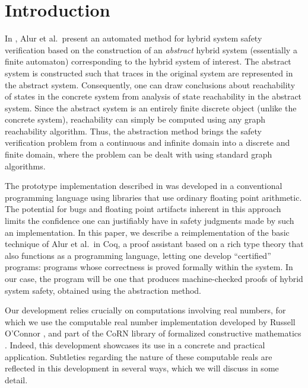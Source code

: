\documentclass[runningheads]{llncs}
\begin{document}
\nocite{*}

\section{Introduction}

In \cite{alur}, Alur et al.\ present an automated method for hybrid system
safety verification based on the construction of an \emph{abstract}
hybrid system (essentially a finite automaton) corresponding to the
hybrid system of interest. The abstract system is constructed such
that traces in the original system are represented in the abstract
system. Consequently, one can draw conclusions about reachability of
states in the concrete system from analysis of state reachability in
the abstract system. Since the abstract system is an entirely finite
discrete object (unlike the concrete system), reachability can simply
be computed using any graph reachability algorithm. Thus, the
abstraction method brings the safety verification problem from a
continuous and infinite domain into a discrete and finite domain,
where the problem can be dealt with using standard graph algorithms.

The prototype implementation described in \cite{alur} was developed in
a conventional programming language using libraries that use ordinary
floating point arithmetic. The potential for bugs and floating point
artifacts inherent in this approach limits the confidence one can
justifiably have in safety judgments made by such an
implementation. In this paper, we describe a reimplementation of the
basic technique of Alur et al.\ in Coq, a proof assistant based on a
rich type theory that also functions as a programming language,
letting one develop ``certified'' programs: programs whose correctness
is proved formally within the system. In our case, the program will be
one that produces machine-checked proofs of hybrid system safety,
obtained using the abstraction method.

Our development relies crucially on computations involving real
numbers, for which we use the computable real number implementation
developed by Russell O'Connor \cite{oconnor}, and part of the CoRN
library of formalized constructive mathematics \cite{corn}. Indeed,
this development showcases its use in a concrete and practical
application. Subtleties regarding the nature of these computable reals
are reflected in this development in several ways, which we will
discuss in some detail.
\end{document}
